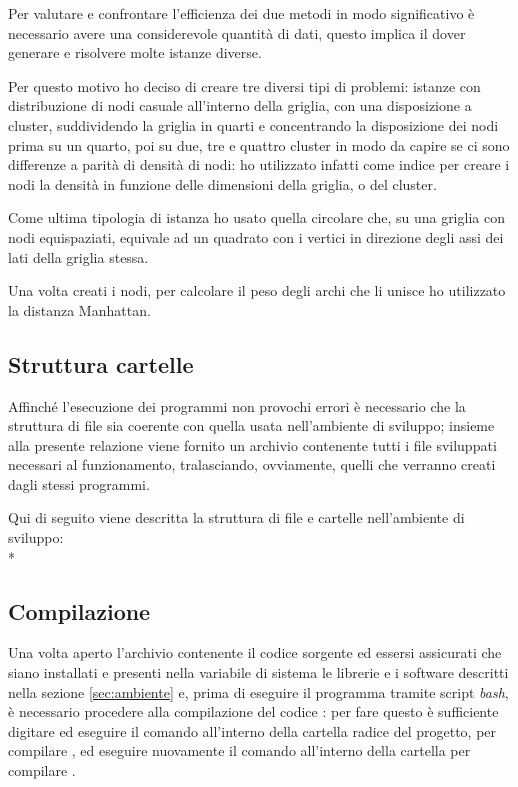 Per valutare e confrontare l'efficienza dei due metodi in modo significativo è necessario avere una considerevole quantità di dati, questo implica il dover generare e risolvere molte istanze diverse.

Per questo motivo ho deciso di creare tre diversi tipi di problemi: istanze con distribuzione di nodi casuale all'interno della griglia, con una disposizione a cluster, suddividendo la griglia in quarti e concentrando la disposizione dei nodi prima su un quarto, poi su due, tre e quattro cluster in modo da capire se ci sono differenze a parità di densità di nodi: ho utilizzato infatti come indice per creare i nodi la densità in funzione delle dimensioni della griglia, o del cluster.

Come ultima tipologia di istanza ho usato quella circolare che, su una griglia con nodi equispaziati, equivale ad un quadrato con i vertici in direzione degli assi dei lati della griglia stessa.

Una volta creati i nodi, per calcolare il peso degli archi che li unisce ho utilizzato la distanza Manhattan.



\subsection{Struttura cartelle}
Affinché l'esecuzione dei programmi non provochi errori è necessario che la struttura di file sia coerente con quella usata nell'ambiente di sviluppo; insieme alla presente relazione viene fornito un archivio contenente tutti i file sviluppati necessari al funzionamento, tralasciando, ovviamente, quelli che verranno creati dagli stessi programmi.

Qui di seguito viene descritta la struttura di file e cartelle nell'ambiente di sviluppo:\\*




\subsection{Compilazione}
Una volta aperto l'archivio contenente il codice sorgente ed essersi assicurati che siano installati e presenti nella variabile di sistema  le librerie e i software descritti nella sezione \ref{sec:ambiente} e, prima di eseguire il programma tramite script \emph{bash}, è necessario procedere alla compilazione del codice : per fare questo è sufficiente digitare ed eseguire il comando  all'interno della cartella radice del progetto, per compilare , ed eseguire nuovamente il comando  all'interno della cartella  per compilare .

